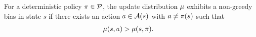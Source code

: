 \begin{definition}
\label{asp: off-policy bias}
For a deterministic policy $\pi \in \mathcal{P}$,
the update distribution $\mu$
exhibits a non-greedy bias in state $s$
if there exists an action $a \in \mathcal{A}(s)$ with $a \neq \pi(s)$ such that
\begin{align*}
    \mu(s, a) > \mu(s, \pi) .
\end{align*}
\end{definition}